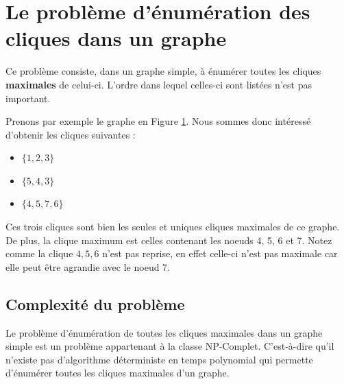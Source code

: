 \documentclass[12pt,a4paper]{article}
\begin{document}
\section{Le problème d'énumération des cliques dans un graphe}
Ce problème consiste, dans un graphe simple, à énumérer toutes les cliques \textbf{maximales} de celui-ci. L'ordre dans lequel celles-ci sont listées n'est pas important.

\begin{figure}[h]
  \begin{center}
    \caption{}
    \label{fig:x clique3}
  \end{center}
\end{figure}


Prenons par exemple le graphe en Figure \ref{fig:x clique3}. Nous sommes donc intéressé d'obtenir les cliques suivantes :
\begin{itemize}
        \item \(\{1, 2, 3\}\)
        \item \(\{5, 4, 3\}\)
        \item \(\{4, 5, 7, 6\}\)
\end{itemize}
Ces trois cliques sont bien les seules et uniques cliques maximales de ce graphe. De plus, la clique maximum est celles contenant les noeuds 4, 5, 6 et 7.
Notez comme la clique \({4, 5, 6}\) n'est pas reprise, en effet celle-ci n'est pas maximale car elle peut être agrandie avec le noeud 7.

\subsection{Complexité du problème}
Le problème d'énumération de toutes les cliques maximales dans un graphe simple est un problème appartenant à la classe NP-Complet. C'est-à-dire qu'il n'existe pas d'algorithme déterministe en temps polynomial qui permette d'énumérer toutes les cliques maximales d'un graphe.
\end{document}
